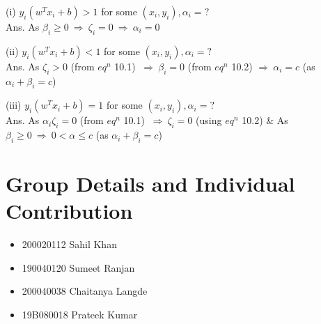 \documentclass[11pt, twosides]{article}
\begin{document}
(i) $y_{i}(w^T x_{i} + b)>1$ for some $(x_{i},y_{i}), \alpha_{i}=?$   \\
Ans. As $\beta_{i}\geq0 \ \Rightarrow \ \zeta_{i}=0 \ \Rightarrow \ \alpha_{i}=0$

(ii) $y_{i}(w^T x_{i} + b)<1$ for some $(x_{i},y_{i}), \alpha_{i}=?$   \\
Ans. As $\zeta_{i}>0$ (from $eq^n$ 10.1) $ \ \Rightarrow \ \beta_{i}=0 $ (from $eq^n$ 10.2) $ \Rightarrow \ \alpha_{i}=c $ (as $\alpha_{i}+\beta_{i}=c$)

(iii) $y_{i}(w^T x_{i} + b)=1$ for some $(x_{i},y_{i}), \alpha_{i}=?$   \\
Ans. As $ \alpha_{i}\zeta_{i}=0 $ (from $eq^n$ 10.1) $ \ \Rightarrow \ \zeta_{i}=0 $ (using $eq^n$ 10.2)  \& As $ \beta_{i}\geq0 \ \Rightarrow \ 0<\alpha\leq c $ (as $\alpha_{i}+\beta_{i}=c$)


\section{Group Details and Individual Contribution}

\begin{itemize}
    \item 200020112 Sahil Khan
    \item 190040120 Sumeet Ranjan
    \item 200040038 Chaitanya Langde
    \item 19B080018 Prateek Kumar
\end{itemize}
\end{document}
